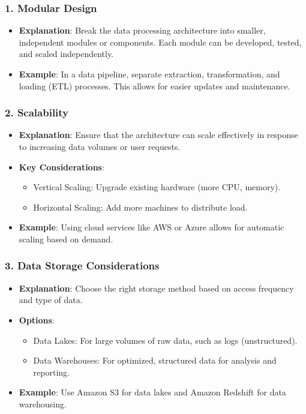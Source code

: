 \documentclass[aspectratio=169]{beamer}
\begin{document}
\begin{frame}[fragile]
    \frametitle{1. Modular Design}
    \begin{itemize}
        \item \textbf{Explanation}: 
            Break the data processing architecture into smaller, independent modules or components. Each module can be developed, tested, and scaled independently.
        \item \textbf{Example}: 
            In a data pipeline, separate extraction, transformation, and loading (ETL) processes. This allows for easier updates and maintenance.
    \end{itemize}
\end{frame}

\begin{frame}[fragile]
    \frametitle{2. Scalability}
    \begin{itemize}
        \item \textbf{Explanation}: 
            Ensure that the architecture can scale effectively in response to increasing data volumes or user requests.
        \item \textbf{Key Considerations}:
            \begin{itemize}
                \item Vertical Scaling: Upgrade existing hardware (more CPU, memory).
                \item Horizontal Scaling: Add more machines to distribute load.
            \end{itemize}
        \item \textbf{Example}: 
            Using cloud services like AWS or Azure allows for automatic scaling based on demand.
    \end{itemize}
\end{frame}

\begin{frame}[fragile]
    \frametitle{3. Data Storage Considerations}
    \begin{itemize}
        \item \textbf{Explanation}: 
            Choose the right storage method based on access frequency and type of data.
        \item \textbf{Options}:
            \begin{itemize}
                \item Data Lakes: For large volumes of raw data, such as logs (unstructured).
                \item Data Warehouses: For optimized, structured data for analysis and reporting.
            \end{itemize}
        \item \textbf{Example}: 
            Use Amazon S3 for data lakes and Amazon Redshift for data warehousing.
    \end{itemize}
\end{frame}
\end{document}
